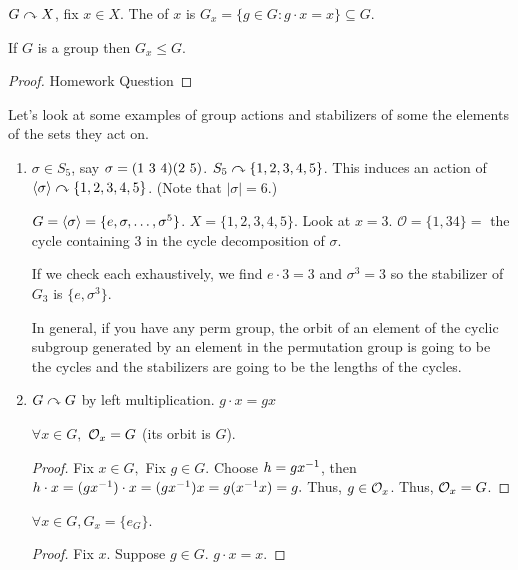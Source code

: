 \documentclass[notes.tex]{subfiles}
\begin{document}

\begin{defn}
	$G\curvearrowright X$, fix $x\in X$. The  of $x$ is $G_x = \{g\in G: g\cdot x = x\}\subseteq G$.
\end{defn}

\begin{proposition}
	If $G$ is a group then $G_x \le G$.
\end{proposition}

\begin{proof}
	Homework Question
\end{proof}


\begin{eg} Let's look at some examples of group actions and stabilizers of some the elements of the sets they act on.
	\begin{enumerate}
		\item
			$\sigma \in S_5$, say $\sigma = \text{(1 3 4)}\text{(2 5)}$.
			$S_5\curvearrowright\{1,2,3,4,5\}$.
			This induces an action of $\left\langle{\sigma}\right\rangle\curvearrowright \{1,2,3,4,5\}$. (Note that $|\sigma| = 6.$)

			$G = \left\langle{\sigma}\right\rangle = \{e, \sigma, \ldots, \sigma^5\}$.
			$X = \{1,2,3,4,5\}$.
			Look at $x=3$.
			$\mathcal{O} = \{1,3 4\} = $ the cycle containing $3$ in the cycle decomposition of $\sigma$.

			If we check each exhaustively, we find $e\cdot 3 = 3$ and $\sigma^3 = 3$ so the stabilizer of $G_3$ is $\{e, \sigma^3\}$.

			In general, if you have any perm group, the orbit of an element of the cyclic subgroup generated by an element in the permutation group is going to be the cycles and the stabilizers are going to be the lengths of the cycles.
		\item
			$G\curvearrowright G$ by left multiplication.
			$g\cdot x = gx$
			\begin{claim}
				$\forall x\in G, $ $\mathcal{O}_x = G$ (its orbit is $G$).
			\end{claim}
			\begin{proof}
				Fix $x\in G,$ Fix $g\in G$. Choose $h = g{x}^{-1}$, then $h\cdot x = (g{x}^{-1})\cdot x = (g{x}^{-1})x = g({x}^{-1}x) =g.$ Thus, $g\in \mathcal{O}_x$. Thus, $\mathcal{O}_x = G$.
			\end{proof}
			\begin{claim}
				$\forall x\in G, G_x = \{e_G\}$.
			\end{claim}
			\begin{proof}
				Fix $x$. Suppose $g\in G$.
				$g\cdot x = x$.


\end{proof}
\end{enumerate}
\end{eg}
\end{document}
